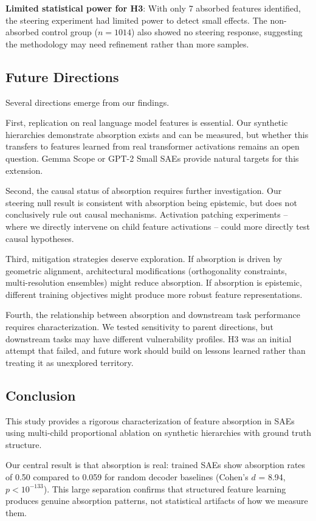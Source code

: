 \documentclass{article}
\begin{document}
\textbf{Limited statistical power for H3}: With only 7 absorbed features identified, the steering experiment had limited power to detect small effects. The non-absorbed control group ($n=1014$) also showed no steering response, suggesting the methodology may need refinement rather than more samples.

\subsection{Future Directions}

Several directions emerge from our findings.

First, replication on real language model features is essential. Our synthetic hierarchies demonstrate absorption exists and can be measured, but whether this transfers to features learned from real transformer activations remains an open question. Gemma Scope or GPT-2 Small SAEs provide natural targets for this extension.

Second, the causal status of absorption requires further investigation. Our steering null result is consistent with absorption being epistemic, but does not conclusively rule out causal mechanisms. Activation patching experiments -- where we directly intervene on child feature activations -- could more directly test causal hypotheses.

Third, mitigation strategies deserve exploration. If absorption is driven by geometric alignment, architectural modifications (orthogonality constraints, multi-resolution ensembles) might reduce absorption. If absorption is epistemic, different training objectives might produce more robust feature representations.

Fourth, the relationship between absorption and downstream task performance requires characterization. We tested sensitivity to parent directions, but downstream tasks may have different vulnerability profiles. H3 was an initial attempt that failed, and future work should build on lessons learned rather than treating it as unexplored territory.

\subsection{Conclusion}

This study provides a rigorous characterization of feature absorption in SAEs using multi-child proportional ablation on synthetic hierarchies with ground truth structure.

Our central result is that absorption is real: trained SAEs show absorption rates of 0.50 compared to 0.059 for random decoder baselines (Cohen's $d$ = 8.94, $p < 10^{-133}$). This large separation confirms that structured feature learning produces genuine absorption patterns, not statistical artifacts of how we measure them.
\end{document}
